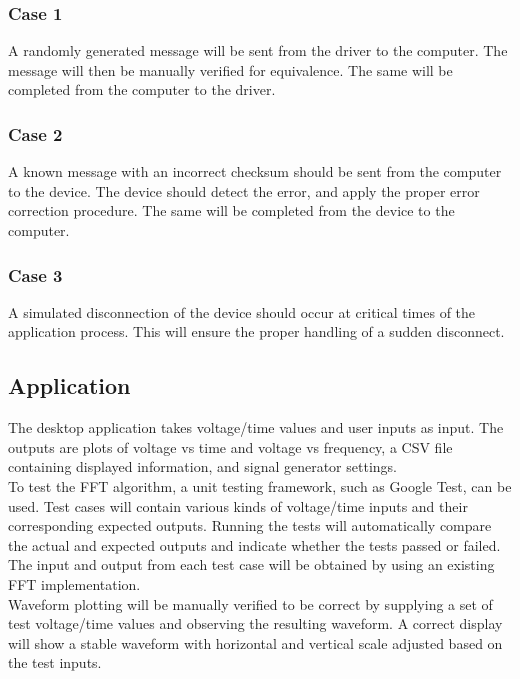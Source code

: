 \documentclass[letterpaper,12pt]{article}
\begin{document}
\subsubsection{Case 1}

A randomly generated message will be sent from the driver to the computer. The
message will then be manually verified for equivalence. The same will be
completed from the computer to the driver.

\subsubsection{Case 2}

A known message with an incorrect checksum should be sent from the computer to
the device. The device should detect the error, and apply the proper error
correction procedure. The same will be completed from the device to the
computer.

\subsubsection{Case 3}

A simulated disconnection of the device should occur at critical times of the
application process. This will ensure the proper handling of a sudden
disconnect.

\subsection{Application} %
The desktop application takes voltage/time values and user inputs as input. The
outputs are plots of voltage vs time and voltage vs frequency, a CSV file
containing displayed information, and signal generator settings. \\

\noindent
To test the FFT algorithm, a unit testing framework, such as Google Test, can be
used. Test cases will contain various kinds of voltage/time inputs and their
corresponding expected outputs. Running the tests will automatically compare the
actual and expected outputs and indicate whether the tests passed or failed. The
input and output from each test case will be obtained by using an existing FFT
implementation. \\

\noindent
Waveform plotting will be manually verified to be correct by supplying a set of
test voltage/time values and observing the resulting waveform. A correct display
will show a stable waveform with horizontal and vertical scale adjusted based on
the test inputs. \\
\end{document}
